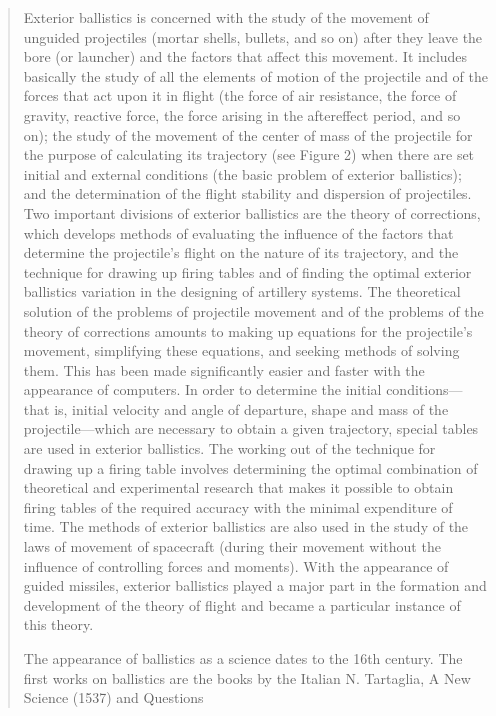 \begin{quotation}
Exterior ballistics is concerned with the study of the movement of
unguided projectiles (mortar shells, bullets, and so on) after they
leave the bore (or launcher) and the factors that affect this
movement. It includes basically the study of all the elements of
motion of the projectile and of the forces that act upon it in flight
(the force of air resistance, the force of gravity, reactive force,
the force arising in the aftereffect period, and so on); the study of
the movement of the center of mass of the projectile for the purpose
of calculating its trajectory (see Figure 2) when there are set
initial and external conditions (the basic problem of exterior
ballistics); and the determination of the flight stability and
dispersion of projectiles. Two important divisions of exterior
ballistics are the theory of corrections, which develops methods of
evaluating the influence of the factors that determine the
projectile’s flight on the nature of its trajectory, and the technique
for drawing up firing tables and of finding the optimal exterior
ballistics variation in the designing of artillery systems. The
theoretical solution of the problems of projectile movement and of the
problems of the theory of corrections amounts to making up equations
for the projectile’s movement, simplifying these equations, and
seeking methods of solving them. This has been made significantly
easier and faster with the appearance of computers. In order to
determine the initial conditions—that is, initial velocity and angle
of departure, shape and mass of the projectile—which are necessary to
obtain a given trajectory, special tables are used in exterior
ballistics. The working out of the technique for drawing up a firing
table involves determining the optimal combination of theoretical and
experimental research that makes it possible to obtain firing tables
of the required accuracy with the minimal expenditure of time. The
methods of exterior ballistics are also used in the study of the laws
of movement of spacecraft (during their movement without the influence
of controlling forces and moments). With the appearance of guided
missiles, exterior ballistics played a major part in the formation and
development of the theory of flight and became a particular instance
of this theory.

The appearance of ballistics as a science dates to the 16th
century. The first works on ballistics are the books by the Italian
N. Tartaglia, A New Science (1537) and Questions


\end{quotation}
